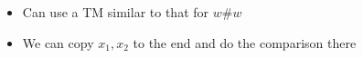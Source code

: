 \begin{frame}[allowframebreaks]
\begin{itemize}
\item [] Can use a TM similar to that for $w \# w$

\item We can copy $x_1, x_2$ to the end
  and do the comparison there
  





\end{itemize}\end{frame}


